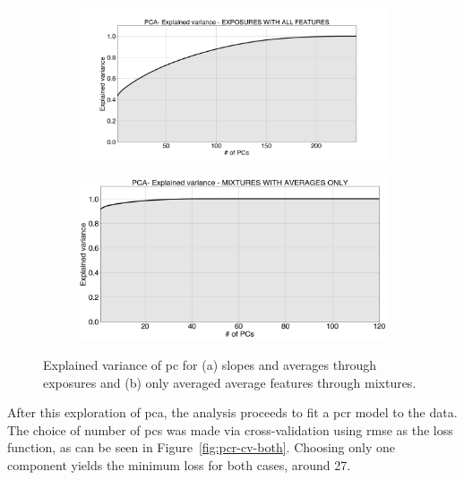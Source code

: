 \begin{figure}[!htb]
	\centering

	\begin{subfigure}[t]{0.5\textwidth}
		\includegraphics[width=1\linewidth]{../figures/pcr-explained-variance.png}
		\caption{}
		\label{fig:pca-exp-var} 
	\end{subfigure}
	
	\begin{subfigure}[t]{0.5\textwidth}
		\includegraphics[width=1\linewidth]{../figures/pcr-explained-variance-avg-feat.png}
		\caption{}
		\label{fig:pca-exp-var-averaged}
	\end{subfigure}
	
	\caption{Explained variance of \acrshort{pc} for (a) slopes and averages through exposures and (b) only averaged average features through mixtures.}
	\label{fig:pca-exp-var-both}
\end{figure}

After this exploration of \acrshort{pca}, the analysis proceeds to fit a \acrshort{pcr} model to the data. The choice of number of \acrshort{pc}s was made via cross-validation using \acrshort{rmse} as the loss function, as can be seen in Figure~\ref{fig:pcr-cv-both}. Choosing only one component yields the minimum loss for both cases, around 27.

